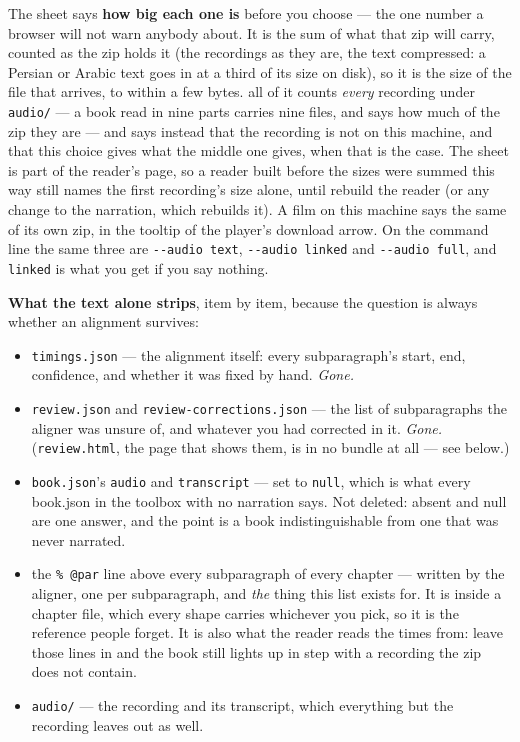 \documentclass[11pt,oneside]{report}
\newcommand{\file}[1]{\texttt{#1}}
\newcommand{\menu}[1]{\textsf{#1}}
\begin{document}
\noindent The sheet says \textbf{how big each one is} before you choose ---
the one number a browser will not warn anybody about. It is the sum of what
that zip will carry, counted as the zip holds it (the recordings as they are,
the text compressed: a Persian or Arabic text goes in at a third of its size
on disk), so it is the size of the file that arrives, to within a few bytes.
\menu{all of it} counts \emph{every} recording under \file{audio/} --- a
book read in nine parts carries nine files, and says how much of the zip
they are --- and says instead that the recording is not on this machine, and
that this choice gives what the middle one gives, when that is the case. The
sheet is part of the reader's page, so a reader built before the sizes were
summed this way still names the first recording's size alone, until
\menu{rebuild the reader} (or any change to the narration, which rebuilds
it). A film on this machine says the same of its own zip, in the tooltip of
the player's \menu{download} arrow. On the command line
the same three are \texttt{-{}-audio text}, \texttt{-{}-audio linked} and
\texttt{-{}-audio full}, and \texttt{linked} is what you get if you say
nothing.

\textbf{What \menu{the text alone} strips}, item by item, because the
question is always whether an alignment survives:

\begin{itemize}
\item \file{timings.json} --- the alignment itself: every subparagraph's
  start, end, confidence, and whether it was fixed by hand. \emph{Gone.}
\item \file{review.json} and \file{review-corrections.json} --- the list of
  subparagraphs the aligner was unsure of, and whatever you had corrected in
  it. \emph{Gone.} (\file{review.html}, the page that shows them, is in no
  bundle at all --- see below.)
\item \file{book.json}'s \texttt{audio} and \texttt{transcript} --- set to
  \texttt{null}, which is what every book.json in the toolbox with no
  narration says. Not deleted: absent and null are one answer, and the
  point is a book indistinguishable from one that was never narrated.
\item the \verb|% @par| line above every subparagraph of every chapter ---
  written by the aligner, one per subparagraph, and \emph{the} thing this
  list exists for. It is inside a chapter file, which every shape carries
  whichever you pick, so it is the reference people forget. It is also what
  the reader reads the times from: leave those lines in and the book still
  lights up in step with a recording the zip does not contain.
\item \file{audio/} --- the recording and its transcript, which
  \menu{everything but the recording} leaves out as well.
\end{itemize}
\end{document}
